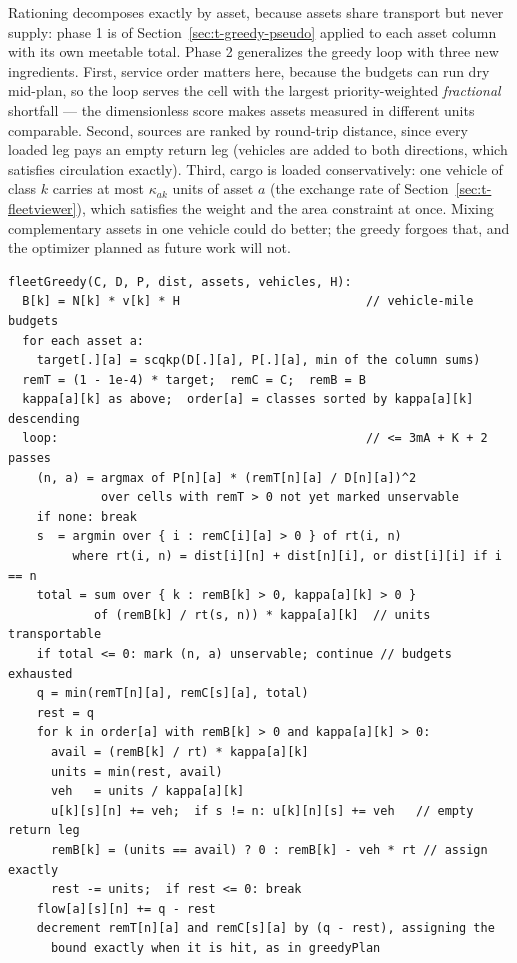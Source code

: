 Rationing decomposes exactly by asset, because assets share transport but
never supply: phase 1 is  of
Section~\ref{sec:t-greedy-pseudo} applied to each asset column with its
own meetable total. Phase 2 generalizes the greedy loop with three new
ingredients. First, service order matters here, because the budgets can
run dry mid-plan, so the loop serves the cell with the largest
priority-weighted \emph{fractional} shortfall --- the dimensionless score
makes assets measured in different units comparable. Second, sources are
ranked by round-trip distance, since every loaded leg pays an empty
return leg (vehicles are added to both directions, which satisfies
circulation exactly). Third, cargo is loaded conservatively: one vehicle
of class $k$ carries at most $\kappa_{ak}$ units of asset $a$ (the
exchange rate of Section~\ref{sec:t-fleetviewer}), which satisfies the
weight and the area constraint at once. Mixing complementary assets in one vehicle could
do better; the greedy forgoes that, and the optimizer planned as future
work will not.

\begin{lstlisting}
fleetGreedy(C, D, P, dist, assets, vehicles, H):
  B[k] = N[k] * v[k] * H                          // vehicle-mile budgets
  for each asset a:
    target[.][a] = scqkp(D[.][a], P[.][a], min of the column sums)
  remT = (1 - 1e-4) * target;  remC = C;  remB = B
  kappa[a][k] as above;  order[a] = classes sorted by kappa[a][k] descending
  loop:                                           // <= 3mA + K + 2 passes
    (n, a) = argmax of P[n][a] * (remT[n][a] / D[n][a])^2
             over cells with remT > 0 not yet marked unservable
    if none: break
    s  = argmin over { i : remC[i][a] > 0 } of rt(i, n)
         where rt(i, n) = dist[i][n] + dist[n][i], or dist[i][i] if i == n
    total = sum over { k : remB[k] > 0, kappa[a][k] > 0 }
            of (remB[k] / rt(s, n)) * kappa[a][k]  // units transportable
    if total <= 0: mark (n, a) unservable; continue // budgets exhausted
    q = min(remT[n][a], remC[s][a], total)
    rest = q
    for k in order[a] with remB[k] > 0 and kappa[a][k] > 0:
      avail = (remB[k] / rt) * kappa[a][k]
      units = min(rest, avail)
      veh   = units / kappa[a][k]
      u[k][s][n] += veh;  if s != n: u[k][n][s] += veh   // empty return leg
      remB[k] = (units == avail) ? 0 : remB[k] - veh * rt // assign exactly
      rest -= units;  if rest <= 0: break
    flow[a][s][n] += q - rest
    decrement remT[n][a] and remC[s][a] by (q - rest), assigning the
      bound exactly when it is hit, as in greedyPlan
\end{lstlisting}

